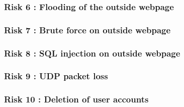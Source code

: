 \documentclass[a4paper,11pt]{article}
\begin{document}
\subsubsection{Risk 6 : Flooding of the outside webpage}
\subsubsection{Risk 7 : Brute force on outside webpage}
\subsubsection{Risk 8 : SQL injection on outside webpage}
\subsubsection{Risk 9 : UDP packet loss}
\subsubsection{Risk 10 : Deletion of user accounts}
\end{document}

